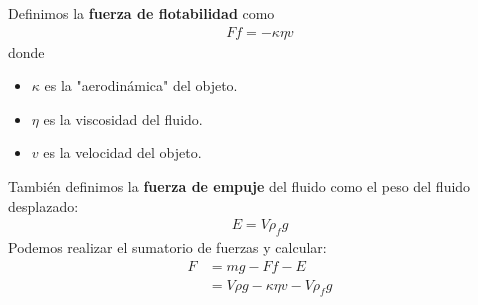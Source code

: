 \documentclass{article}
\begin{document}
Definimos la \textbf{fuerza de flotabilidad} como
\begin{equation}
    \begin{split}
        Ff = - \kappa \eta v
    \end{split}
\end{equation}
donde
\begin{itemize}
    \item $\kappa$ es la "aerodinámica" del objeto.
    \item $\eta $ es la viscosidad del fluido.
    \item $v$ es la velocidad del objeto.
\end{itemize}
También definimos la \textbf{fuerza de empuje} del fluido como el peso
del fluido desplazado:
\begin{equation}
    \begin{split}
        E = V \rho _{f} g
    \end{split}
\end{equation}
Podemos realizar el sumatorio de fuerzas y calcular:
\begin{equation}
    \begin{split}
        F &= mg -Ff - E\\
        &= V \rho g -\kappa \eta v - V\rho _{f} g
    \end{split}
\end{equation}
\end{document}
